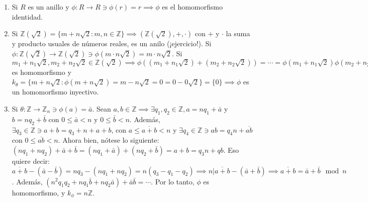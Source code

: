\begin{ejemplo}
\begin{enumerate}
    \item Si $R$ es un anillo y $\phi:R\to R\ni \phi(r)=r\implies \phi$ es el homomorfismo identidad. 
    \item Si $\mathbb{Z}(\sqrt{2})=\{m+n\sqrt{2}:m,n\in\mathbb{Z}\}\implies (\mathbb{Z}(\sqrt{2}),+,\cdot)$ con $+$ y $\cdot$ la suma y producto usuales de números reales, es un anilo (¡ejercicio!). Si $\phi:\mathbb{Z}(\sqrt{2})\to \mathbb{Z}(\sqrt{2})\ni \phi(m\cdot n \sqrt{2})= m\cdot n\sqrt{2}$. Si $m_1+n_1\sqrt{2}, m_2+n_2\sqrt{2}\in\mathbb{Z}(\sqrt{2})\implies \phi((m_1+n_1\sqrt{2})+(m_2+n_2\sqrt{2}))=\cdots = \phi(m_1+n_1\sqrt{2})\phi(m_2+n_2\sqrt{2})\implies \phi $ es homomorfismo y $k_\theta=\{m+n\sqrt{2}:\phi(m+n\sqrt{2})=m-n\sqrt{2}=0=0-0\sqrt{2}\} =\{0\}\implies \phi$ es un homomorfismo inyectivo.
    \item Si $\theta:\mathbb{Z}\to\mathbb{Z}_n\ni \phi(a)=\bar{a}$. Sean $a,b\in \mathbb{Z}\implies \exists q_1,q_2\in\mathbb{Z}, a=nq_1+\bar{a}$ y $b=nq_2+\bar{b}$ con $0\leq \bar{a}< n$ y $0\leq \bar{b}<n$. Además, $\exists q_3\in\mathbb{Z}\ni a+b =q_3+n +a+b$, con $a\leq \overline{a+b}<n$ y $\exists q_4\in\mathbb{Z}\ni ab=q_4n +\overline{ab}$ con $0\leq \overline{ab}<n$. Ahora bien, nótese lo siguiente: $(nq_1+nq_2)+\bar{a}+\bar{b}=(nq_1+\bar{a})+(nq_2+\bar{b})=a+b=q_3n+qb$. Eso quiere decir: $\overline{a+b}-(\bar{a}-\bar{b})=nq_3-(nq_1+nq_2)=n(q_3-q_1-q_2)\implies n|\overline{a+b} - (\bar{a}+\bar{b})\implies \overline{a+b}=\bar{a}+\bar{b} \mod n$. Además, $(n^2q_1q_2 +nq_1\bar{b}+nq_2 \bar{a})+\bar{a}\bar{b}= \cdots $. Por lo tanto, $\phi$ es homomorfismo, y $k_\phi = n\mathbb{Z}$.
\end{enumerate}    
\end{ejemplo}
